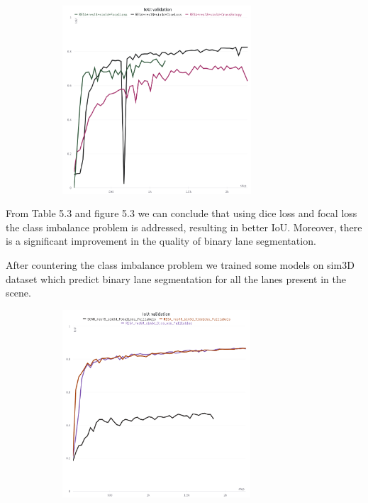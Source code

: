      \begin{figure}[h]
       \caption{IoU for ego-vehicle binary lane segmentation trained on sim3D dataset\cite{guo2020gen} with cross entropy, dice and focal loss.}
        \centering
        \begin{subfigure}{0.6\textwidth}
        \includegraphics[width=1\linewidth, height=7cm]{images/change2.png} 
        \label{fig:subim1}
        \end{subfigure}
        \end{figure}
    
    From Table 5.3 and figure 5.3 we can conclude that using dice loss and focal loss the class imbalance problem is addressed, resulting in better IoU. Moreover, there is a significant improvement in the quality of binary lane segmentation.
    
        After countering the class imbalance problem we trained some models on sim3D dataset which predict binary lane segmentation for all the lanes present in the scene.
        
        \begin{figure}[h]
       \caption{IoU for binary lane segmentation trained on sim3D dataset with cross entropy, dice and focal loss.}
        \centering
        \begin{subfigure}{0.6\textwidth}
        \includegraphics[width=1\linewidth, height=7cm]{images/change1.png} 
        \label{fig:subim1}
        \end{subfigure}
        \end{figure}
           
